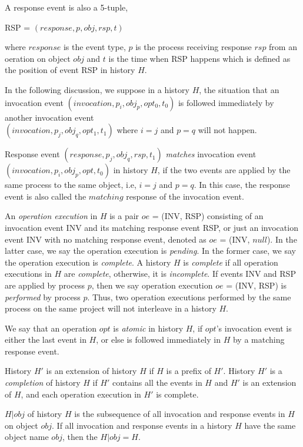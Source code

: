 A response event is also a 5-tuple,
\begin{center}
RSP = $(response, p, obj, rsp, t)$
\end{center}
where $response$ is the event type, $p$ is the process receiving response $rsp$ from an oeration on object $obj$ and $t$
is the time when RSP happens which is defined as the position of event RSP in history $H$.

In the following discussion, we suppose in a history $H$, the situation that an invocation event
$(invocation, p_i, obj_p, opt_0, t_0)$ is followed immediately by another invocation event\\
$(invocation, p_j, obj_q, opt_1, t_1)$ where $i = j$ and $p = q$ will not happen.

Response event $(response, p_j, obj_q, rsp, t_1)$ \emph{matches} invocation event $(invocation, p_i, obj_p, opt, t_0)$
in history $H$, if the two events are applied by the same process to the same object, i.e, $i = j$ and $p = q$.
In this case, the response event is also called the $matching$ response of the invocation event.

An \emph{operation execution} in $H$ is a pair $oe$ = (INV, RSP) consisting of an invocation event INV
and its matching response event RSP, or just an invocation event INV with no matching response event,
denoted as $oe$ = (INV, $null$).
In the latter case, we say the operation execution is \emph{pending}. In the former case, we say the operation
execution is \emph{complete}. A history $H$ is \emph{complete} if all operation executions in $H$ are \emph{complete},
otherwise, it is \emph{incomplete}. If events INV and RSP are applied by process $p$, then we say
operation execution $oe$ = (INV, RSP) is \emph{performed} by process $p$. Thus, two operation
executions performed by the same process on the same project will not interleave in a history $H$.

We say that an operation $opt$ is \emph{atomic} in history $H$, if $opt$'s invocation event is either the last event in
$H$, or else is followed immediately in $H$ by a matching response event.

History $H'$ is an extension of history $H$ if $H$ is a prefix of $H'$.
History $H'$ is a \emph{completion} of history $H$ if $H'$ contains all the
events in $H$ and $H'$ is an extension of $H$, and each operation execution in $H'$ is complete.

$H|obj$ of history $H$ is the subsequence of all
invocation and response events in $H$ on object $obj$. If all invocation and response
events in a history $H$ have the same object name $obj$, then the $H|obj = H$.

